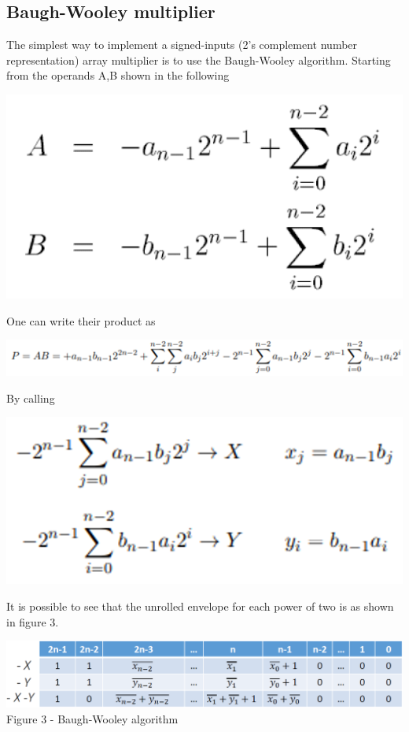 \documentclass[11pt]{article} %
\begin{document}
\subsection{Baugh-Wooley multiplier}
The simplest way to implement a signed-inputs (2's complement number representation) array multiplier is to use the Baugh-Wooley algorithm. Starting from the operands A,B shown in the following 
\begin{center}
\includegraphics[scale=.34]{ab.PNG}\\
\end{center}
One can write their product as
\begin{center}
\includegraphics[scale=.42]{p.PNG}\\
\end{center}
By calling
\begin{center}
\includegraphics[scale=.34]{calling.PNG}\\
\end{center}
It is possible to see that the unrolled envelope for each power of two is as shown in figure 3.
\begin{center}
\includegraphics[scale=.38]{bw.PNG}\\
\small{Figure 3 - Baugh-Wooley algorithm}\\
\end{center}
\end{document}
